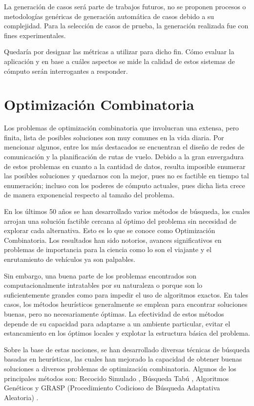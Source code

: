 \documentclass[a4paper,openright,11pt,oneside]{book}
\begin{document}
		La generación de casos será parte de trabajos futuros, no se proponen procesos o metodologías genéricas de generación automática de casos debido a su complejidad. Para la selección de casos de prueba, la generación realizada fue con fines experimentales.
		
		Quedaría por designar las métricas a utilizar para dicho fin. Cómo evaluar la aplicación y en base a cuáles aspectos se mide la calidad de estos sistemas de cómputo serán interrogantes a responder.

\chapter{Optimización Combinatoria}
	Los problemas de optimización combinatoria que involucran una extensa, pero finita, lista de posibles soluciones son muy comunes en la vida diaria. Por mencionar algunos, entre los más destacados se encuentran el diseño de redes de comunicación y la planificación de rutas de vuelo. Debido a la gran envergadura de estos problemas en cuanto a la cantidad de datos, resulta imposible enumerar las posibles soluciones y quedarnos con la mejor, pues no es factible en tiempo tal enumeración; incluso con los poderes de cómputo actuales, pues dicha lista crece de manera exponencial respecto al tamaño del problema.
	
	En los últimos 50 años se han desarrollado varios métodos de búsqueda, los cuales arrojan una solución factible cercana al óptimo del problema sin necesidad de explorar cada alternativa. Esto es lo que se conoce como Optimización Combinatoria. Los resultados han sido notorios, avances significativos en problemas de importancia para la ciencia como lo son el viajante y el enrutamiento de vehículos ya son palpables.
	
	Sin embargo, una buena parte de los problemas encontrados son computacionalmente intratables por su naturaleza o porque son lo suficientemente grandes como para impedir el uso de algoritmos exactos. En tales casos, los métodos heurísticos generalmente se emplean para encontrar soluciones buenas, pero no necesariamente óptimas. La efectividad de estos métodos depende de su capacidad para adaptarse a un ambiente particular, evitar el estancamiento en los óptimos locales y explotar la estructura básica del problema.
	
	Sobre la base de estas nociones, se han desarrollado diversas técnicas de búsqueda basadas en heurísticas, las cuales han mejorado la capacidad de obtener buenas soluciones a diversos problemas de optimización combinatoria. Algunos de los principales métodos son: Recocido Simulado \cite{dowsland2003diseno}, Búsqueda Tabú \cite{cunquero2003algoritmos}, Algoritmos Genéticos \cite{jimenez2009busquedas} y GRASP (Procedimiento Codicioso de Búsqueda Adaptativa Aleatoria) \cite{resende2003grasp}.
	
\end{document}

